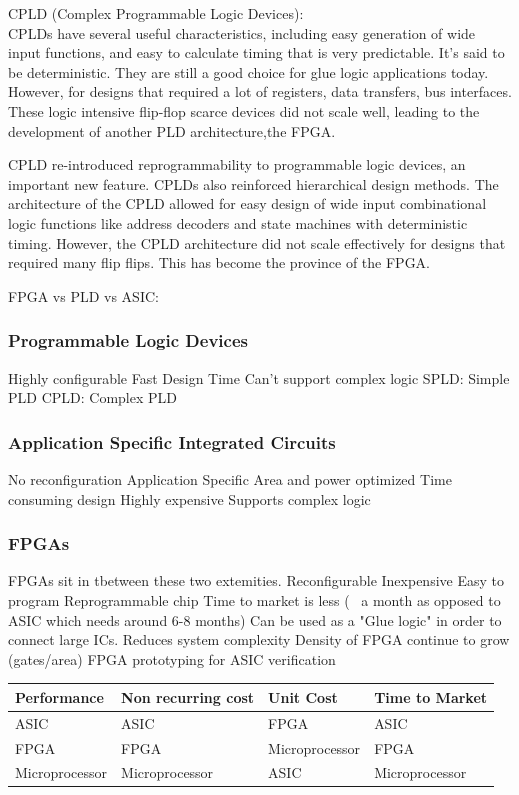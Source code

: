 CPLD (Complex Programmable Logic Devices):\\
CPLDs have several useful characteristics, including easy generation of wide input functions, and easy to calculate timing that is very predictable. It's said to be deterministic. They are still a good choice for glue logic applications today. However, for designs that required a lot of registers, data transfers, bus interfaces. These logic intensive flip-flop scarce devices did not scale well, leading to the development of another PLD architecture,the FPGA.


CPLD re-introduced reprogrammability to programmable logic devices, an important new feature. CPLDs also reinforced hierarchical design methods. The architecture of the CPLD allowed for easy design of wide input combinational logic functions like address decoders and state machines with deterministic timing. However, the CPLD architecture did not scale effectively for designs that required many flip flips. This has become the province of the FPGA.

FPGA vs PLD vs ASIC:

\subsubsection{Programmable Logic Devices}
Highly configurable
Fast Design Time
Can't support complex logic
SPLD: Simple PLD
CPLD: Complex PLD
\subsubsection{Application Specific Integrated Circuits}
No reconfiguration
Application Specific
Area and power optimized
Time consuming design
Highly expensive
Supports complex logic
\subsubsection{FPGAs}
FPGAs sit in tbetween these two extemities.
Reconfigurable
Inexpensive
Easy to program
Reprogrammable chip
Time to market is less (~ a month as opposed to ASIC which needs around 6-8 months)
Can be used as a "Glue logic" in order to connect large ICs.
Reduces system complexity
Density of FPGA continue to grow (gates/area)
FPGA prototyping for ASIC verification

\begin{table}[H]
\begin{center}
\begin{tabular}{@{}llll@{}}
\toprule
\textbf{Performance} & \textbf{Non recurring cost} & \textbf{Unit Cost} & \textbf{Time to Market} \\ \midrule
ASIC                 & ASIC                        & FPGA               & ASIC                    \\
FPGA                 & FPGA                        & Microprocessor     & FPGA                    \\
Microprocessor       & Microprocessor              & ASIC               & Microprocessor          \\ \bottomrule
\end{tabular}

\end{center}
\end{table}

